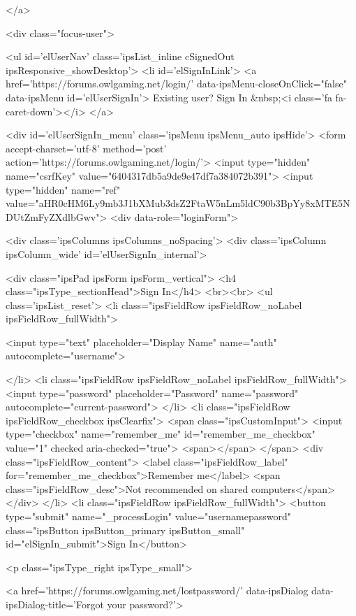 	
</a>
									
										<div class="focus-user">

	<ul id='elUserNav' class='ipsList_inline cSignedOut ipsResponsive_showDesktop'>
		<li id='elSignInLink'>
			<a href='https://forums.owlgaming.net/login/' data-ipsMenu-closeOnClick="false" data-ipsMenu id='elUserSignIn'>
				Existing user? Sign In &nbsp;<i class='fa fa-caret-down'></i>
			</a>
			
<div id='elUserSignIn_menu' class='ipsMenu ipsMenu_auto ipsHide'>
	<form accept-charset='utf-8' method='post' action='https://forums.owlgaming.net/login/'>
		<input type="hidden" name="csrfKey" value="6404317db5a9de9e47df7a384072b391">
		<input type="hidden" name="ref" value="aHR0cHM6Ly9mb3J1bXMub3dsZ2FtaW5nLm5ldC90b3BpYy8xMTE5NDUtZmFyZXdlbGwv">
		<div data-role="loginForm">
			
			
			
				<div class='ipsColumns ipsColumns_noSpacing'>
					<div class='ipsColumn ipsColumn_wide' id='elUserSignIn_internal'>
						
<div class="ipsPad ipsForm ipsForm_vertical">
	<h4 class="ipsType_sectionHead">Sign In</h4>
	<br><br>
	<ul class='ipsList_reset'>
		<li class="ipsFieldRow ipsFieldRow_noLabel ipsFieldRow_fullWidth">
			
			
				<input type="text" placeholder="Display Name" name="auth" autocomplete="username">
			
		</li>
		<li class="ipsFieldRow ipsFieldRow_noLabel ipsFieldRow_fullWidth">
			<input type="password" placeholder="Password" name="password" autocomplete="current-password">
		</li>
		<li class="ipsFieldRow ipsFieldRow_checkbox ipsClearfix">
			<span class="ipsCustomInput">
				<input type="checkbox" name="remember_me" id="remember_me_checkbox" value="1" checked aria-checked="true">
				<span></span>
			</span>
			<div class="ipsFieldRow_content">
				<label class="ipsFieldRow_label" for="remember_me_checkbox">Remember me</label>
				<span class="ipsFieldRow_desc">Not recommended on shared computers</span>
			</div>
		</li>
		<li class="ipsFieldRow ipsFieldRow_fullWidth">
			<button type="submit" name="_processLogin" value="usernamepassword" class="ipsButton ipsButton_primary ipsButton_small" id="elSignIn_submit">Sign In</button>
			
				<p class="ipsType_right ipsType_small">
					
						<a href='https://forums.owlgaming.net/lostpassword/' data-ipsDialog data-ipsDialog-title='Forgot your password?'>
					
